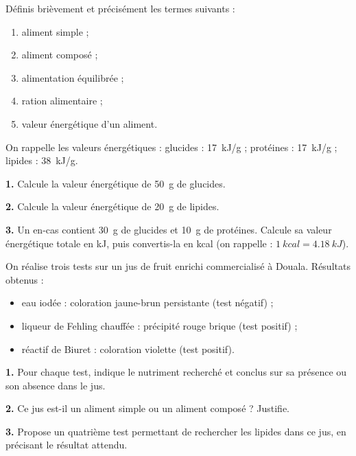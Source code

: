 \documentclass[11pt]{article}
\newcounter{popsec}
\newcounter{popsub}
\newcommand{\courssub}[1]{%
  \stepcounter{popsub}%
  \par\vspace{9pt}\noindent{\popxbold\fontsize{11.5}{13}\selectfont\color{popink}{\color{poporange}\thepopsec.\thepopsub}\hspace{6pt}#1}\par\nopagebreak\vspace{4pt}
}
\begin{document}
\begin{exercice}[Définitions]
Définis brièvement et précisément les termes suivants :
\begin{enumerate}
\item aliment simple ;
\item aliment composé ;
\item alimentation équilibrée ;
\item ration alimentaire ;
\item valeur énergétique d'un aliment.
\end{enumerate}
\end{exercice}

\begin{exercice}
On rappelle les valeurs énergétiques : glucides : \SI{17}{kJ/g} ; protéines : \SI{17}{kJ/g} ; lipides : \SI{38}{kJ/g}.

\textbf{1.} Calcule la valeur énergétique de \SI{50}{g} de glucides.

\textbf{2.} Calcule la valeur énergétique de \SI{20}{g} de lipides.

\textbf{3.} Un en-cas contient \SI{30}{g} de glucides et \SI{10}{g} de protéines. Calcule sa valeur énergétique totale en kJ, puis convertis-la en kcal (on rappelle : $\SI{1}{kcal} = \SI{4,18}{kJ}$).
\end{exercice}

\courssub{Je m'entraîne}

\begin{exercice}
On réalise trois tests sur un jus de fruit enrichi commercialisé à Douala. Résultats obtenus :
\begin{itemize}
\item eau iodée : coloration jaune-brun persistante (test négatif) ;
\item liqueur de Fehling chauffée : précipité rouge brique (test positif) ;
\item réactif de Biuret : coloration violette (test positif).
\end{itemize}

\textbf{1.} Pour chaque test, indique le nutriment recherché et conclus sur sa présence ou son absence dans le jus.

\textbf{2.} Ce jus est-il un aliment simple ou un aliment composé ? Justifie.

\textbf{3.} Propose un quatrième test permettant de rechercher les lipides dans ce jus, en précisant le résultat attendu.
\end{exercice}
\end{document}
